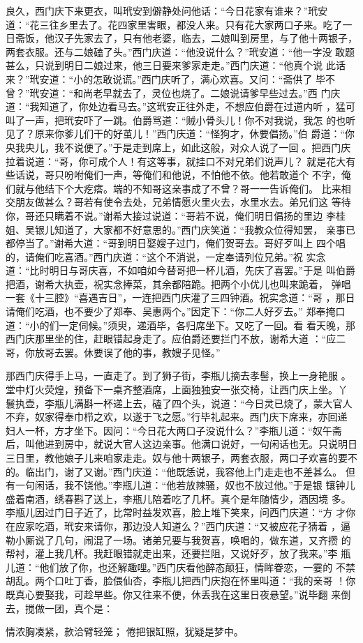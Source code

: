 良久，西门庆下来更衣，叫玳安到僻静处问他话：“今日花家有谁来？”玳安
道：“花三往乡里去了。花四家里害眼，都没人来。只有花大家两口子来。吃了一
日斋饭，他汉子先家去了，只有他老婆，临去，二娘叫到房里，与了他十两银子，
两套衣服。还与二娘磕了头。”西门庆道：“他没说什么？”玳安道：“他一字没
敢题甚么，只说到明日二娘过来，他三日要来爹家走走。”西门庆道：“他真个说
此话来？”玳安道：“小的怎敢说谎。”西门庆听了，满心欢喜。又问：“斋供了
毕不曾？”玳安道：“和尚老早就去了，灵位也烧了。二娘说请爹早些过去。”西
门庆道：“我知道了，你处边看马去。”这玳安正往外走，不想应伯爵在过道内听
，猛可叫了一声，把玳安吓了一跳。伯爵骂道：“贼小骨头儿！你不对我说，我怎
的也听见了？原来你爹儿们干的好茧儿！”西门庆道：“怪狗才，休要倡扬。”伯
爵道：“你央我央儿，我不说便了。”于是走到席上，如此这般，对众人说了一回
。把西门庆拉着说道：“哥，你可成个人！有这等事，就挂口不对兄弟们说声儿？
就是花大有些话说，哥只吩咐俺们一声，等俺们和他说，不怕他不依。他若敢道个
不字，俺们就与他结下个大疙瘩。端的不知哥这亲事成了不曾？哥一一告诉俺们。
比来相交朋友做甚么？哥若有使令去处，兄弟情愿火里火去，水里水去。弟兄们这
等待你，哥还只瞒着不说。”谢希大接过说道：“哥若不说，俺们明日倡扬的里边
李桂姐、吴银儿知道了，大家都不好意思的。”西门庆笑道：“我教众位得知罢，
亲事已都停当了。”谢希大道：“哥到明日娶嫂子过门，俺们贺哥去。哥好歹叫上
四个唱的，请俺们吃喜酒。”西门庆道：“这个不消说，一定奉请列位兄弟。”祝
实念道：“比时明日与哥庆喜，不如咱如今替哥把一杯儿酒，先庆了喜罢。”于是
叫伯爵把酒，谢希大执壶，祝实念捧菜，其余都陪跪。把两个小优儿也叫来跪着，
弹唱一套《十三腔》“喜遇吉日”，一连把西门庆灌了三四钟酒。祝实念道：“哥
，那日请俺们吃酒，也不要少了郑奉、吴惠两个。”因定下：“你二人好歹去。”
郑奉掩口道：“小的们一定伺候。”须臾，递酒毕，各归席坐下。又吃了一回。看
看天晚，那西门庆那里坐的住，赶眼错起身走了。应伯爵还要拦门不放，谢希大道
：“应二哥，你放哥去罢。休要误了他的事，教嫂子见怪。”

那西门庆得手上马，一直走了。到了狮子街，李瓶儿摘去孝髻，换上一身艳服
。堂中灯火荧煌，预备下一桌齐整酒席，上面独独安一张交椅，让西门庆上坐。丫
鬟执壶，李瓶儿满斟一杯递上去，磕了四个头，说道：“今日灵已烧了，蒙大官人
不弃，奴家得奉巾栉之欢，以遂于飞之愿。”行毕礼起来。西门庆下席来，亦回递
妇人一杯，方才坐下。因问：“今日花大两口子没说什么？”李瓶儿道：“奴午斋
后，叫他进到房中，就说大官人这边亲事。他满口说好，一句闲话也无。只说明日
三日里，教他娘子儿来咱家走走。奴与他十两银子，两套衣服，两口子欢喜的要不
的。临出门，谢了又谢。”西门庆道：“他既恁说，我容他上门走走也不差甚么。
但有一句闲话，我不饶他。”李瓶儿道：“他若放辣骚，奴也不放过他。”于是银
镶钟儿盛着南酒，绣春斟了送上，李瓶儿陪着吃了几杯。真个是年随情少，酒因境
多。李瓶儿因过门日子近了，比常时益发欢喜，脸上堆下笑来，问西门庆道：“方
才你在应家吃酒，玳安来请你，那边没人知道么？”西门庆道：“又被应花子猜着
，逼勒小厮说了几句，闹混了一场。诸弟兄要与我贺喜，唤唱的，做东道，又齐攒
的帮衬，灌上我几杯。我赶眼错就走出来，还要拦阻，又说好歹，放了我来。”李
瓶儿道：“他们放了你，也还解趣哩。”西门庆看他醉态颠狂，情眸眷恋，一霎的
不禁胡乱。两个口吐丁香，脸偎仙杏，李瓶儿把西门庆抱在怀里叫道：“我的亲哥
！你既真心要娶我，可趁早些。你又往来不便，休丢我在这里日夜悬望。”说毕翻
来倒去，搅做一团，真个是：

情浓胸凑紧，款洽臂轻笼；
倦把银缸照，犹疑是梦中。